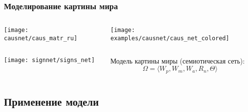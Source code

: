 \documentclass[default]{beamer}
\begin{document}
	\begin{frame}
		\frametitle{Моделирование картины мира}
		\begin{columns}
			\begin{column}{0.5\textwidth}
				\centering
				\texttt{[image: causnet/caus\_matr\_ru]}
				
				
			\end{column}
			\begin{column}{0.5\textwidth}
				\centering
				\texttt{[image: examples/causnet/caus\_net\_colored]}
			\end{column}
		\end{columns}
		\begin{columns}
			\begin{column}{0.5\textwidth}
				\centering
				\texttt{[image: signnet/signs\_net]}
			\end{column}
			\begin{column}{0.5\textwidth}
				Модель картины миры (семиотическая сеть):
				\[\Omega=\langle W_p, W_m, W_a, R_n, \Theta \rangle\]
				
				\vspace{-5pt}
				\nocite{*}
				\printbibliography[keyword={signmodel}, resetnumbers=true]
			\end{column}
		\end{columns}
	\end{frame}

	\subsection{Применение модели}
	
\end{document}
